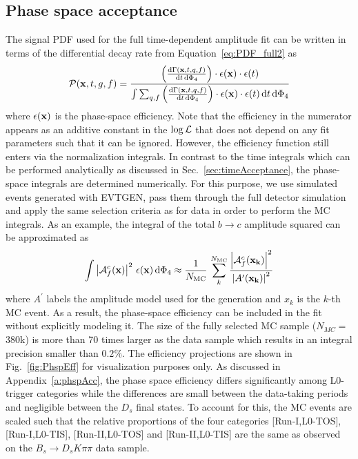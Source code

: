 \clearpage
\subsection{Phase space acceptance}
\label{sec:phasespaceAcceptance}

The signal PDF used for the full time-dependent amplitude fit can be written in terms of the differential decay rate from Equation~\ref{eq:PDF_full2} as
\begin{equation}
	\mathcal P(\mathbf{x},t,g,f) = 
	\frac{ \left( \frac{\text{d}\Gamma(\mathbf{x},t,q,f)}{\text{d}t \, \text{d}\Phi_4} \right) \cdot \epsilon(\mathbf{x}) \cdot \epsilon(t) }{\int \sum_{q,f} \left( \frac{\text{d}\Gamma(\mathbf{x},t,q,f)}{\text{d}t \, \text{d}\Phi_4} \right) \cdot \epsilon(\mathbf{x}) \cdot \epsilon(t) \, \text{d}t \, \text{d}\Phi_{4}  }  
\end{equation}
where $\epsilon(\mathbf{x})$ is the phase-space efficiency. 
Note that the efficiency in the numerator appears as an additive constant in the $\log {\cal L}$ that does not depend on any fit parameters such that it can be ignored.
However, the efficiency function still enters via the normalization integrals. 
In contrast to the time integrals which can be performed analytically as discussed in Sec.~\ref{sec:timeAcceptance},
the phase-space integrals are determined numerically.
For this purpose, we use simulated events generated with \textsf{EVTGEN}, pass them 
through the full detector simulation and apply the same selection criteria as for data 
in order to perform the MC integrals.
As an example, the integral of the total $b \to c$ amplitude squared can be approximated as 
\begin{equation}
	\label{eq:pdfPhspAcc}
	\int \left\vert   \mathcal A^c_{f}(\mathbf{x}) \right\vert^{2} \, \epsilon(\mathbf{x}) \, \text{d}\Phi_{4}   \approx 
	\frac{1}{N_{\rm MC}} \, \sum_{k}^{N_{\rm MC}}    \frac{\left\vert   \mathcal A^c_{f}(\bold{x_{k}}) \right\vert^{2}}
	{\left\vert A^{\prime}(\bold{x_{k}}) \right\vert^{2}}
\end{equation}
where $A^{\prime}$ labels the amplitude model used for the generation and
$x_{k}$ is the $k$-th MC event. As a result, the phase-space efficiency can be included in the  fit without explicitly modeling it.
The size of the fully selected MC sample ($N_{MC} =$380k) is more than 70 times larger as the data sample which results in an integral precision smaller than $0.2 \%$.
The efficiency projections are shown in Fig.~\ref{fig:PhspEff} for visualization purposes only.
As discussed in Appendix~\ref{a:phspAcc}, the phase space efficiency differs significantly among L0-trigger categories
while the differences are small between the data-taking periods 
and negligible between the $D_s$ final states.
To account for this, the MC events are scaled such that the relative proportions of the four categories [Run-I,\textsf{L0-TOS}], [Run-I,\textsf{L0-TIS}], [Run-II,\textsf{L0-TOS}] and [Run-II,\textsf{L0-TIS}] are the same as observed on the $B_s \to D_s K \pi\pi$ data sample.

